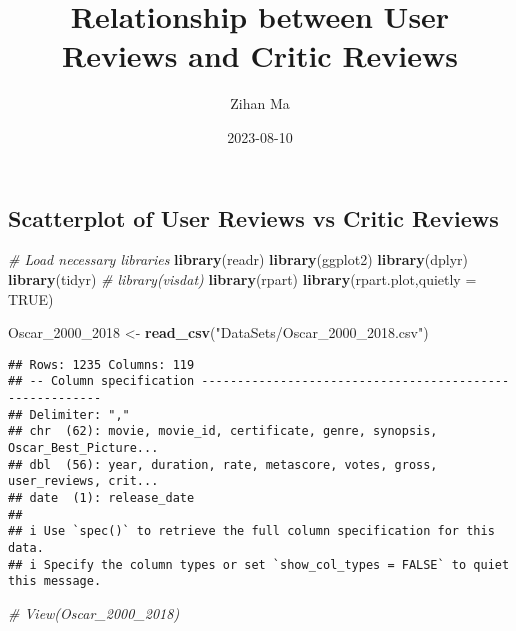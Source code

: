 \documentclass[
]{article}
\title{Relationship between User Reviews and Critic Reviews}
\author{Zihan Ma}
\date{2023-08-10}
\newenvironment{Shaded}{\begin{snugshade}}{\end{snugshade}}
\newcommand{\AttributeTok}[1]{\textcolor[rgb]{0.13,0.29,0.53}{#1}}
\newcommand{\CommentTok}[1]{\textcolor[rgb]{0.56,0.35,0.01}{\textit{#1}}}
\newcommand{\ConstantTok}[1]{\textcolor[rgb]{0.56,0.35,0.01}{#1}}
\newcommand{\FunctionTok}[1]{\textcolor[rgb]{0.13,0.29,0.53}{\textbf{#1}}}
\newcommand{\NormalTok}[1]{#1}
\newcommand{\OtherTok}[1]{\textcolor[rgb]{0.56,0.35,0.01}{#1}}
\newcommand{\StringTok}[1]{\textcolor[rgb]{0.31,0.60,0.02}{#1}}
\begin{document}
\maketitle

\hypertarget{scatterplot-of-user-reviews-vs-critic-reviews}{%
\subsection{Scatterplot of User Reviews vs Critic
Reviews}\label{scatterplot-of-user-reviews-vs-critic-reviews}}

\begin{Shaded}
\begin{Highlighting}[]
\CommentTok{\# Load necessary libraries}
\FunctionTok{library}\NormalTok{(readr)}
\FunctionTok{library}\NormalTok{(ggplot2)}
\FunctionTok{library}\NormalTok{(dplyr)}
\FunctionTok{library}\NormalTok{(tidyr)}
\CommentTok{\# library(visdat)}
\FunctionTok{library}\NormalTok{(rpart)}
\FunctionTok{library}\NormalTok{(rpart.plot,}\AttributeTok{quietly =} \ConstantTok{TRUE}\NormalTok{)}
\end{Highlighting}
\end{Shaded}

\begin{Shaded}
\begin{Highlighting}[]
\NormalTok{Oscar\_2000\_2018 }\OtherTok{\textless{}{-}} \FunctionTok{read\_csv}\NormalTok{(}\StringTok{"DataSets/Oscar\_2000\_2018.csv"}\NormalTok{)}
\end{Highlighting}
\end{Shaded}

\begin{verbatim}
## Rows: 1235 Columns: 119
## -- Column specification --------------------------------------------------------
## Delimiter: ","
## chr  (62): movie, movie_id, certificate, genre, synopsis, Oscar_Best_Picture...
## dbl  (56): year, duration, rate, metascore, votes, gross, user_reviews, crit...
## date  (1): release_date
## 
## i Use `spec()` to retrieve the full column specification for this data.
## i Specify the column types or set `show_col_types = FALSE` to quiet this message.
\end{verbatim}

\begin{Shaded}
\begin{Highlighting}[]
\CommentTok{\# View(Oscar\_2000\_2018)}
\end{Highlighting}
\end{Shaded}
\end{document}
